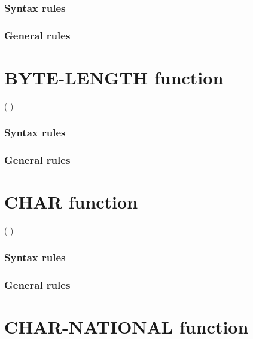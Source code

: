 \subsubsection{Syntax rules}

\subsubsection{General rules}

\section{BYTE-LENGTH function}

\begin{syntax}
    ( \argument )
\end{syntax}

\subsubsection{Syntax rules}

\subsubsection{General rules}

\section{CHAR function}

\begin{syntax}
    ( \argument )
\end{syntax}

\subsubsection{Syntax rules}

\subsubsection{General rules}

\section{CHAR-NATIONAL function}

\begin{syntax}
\end{syntax}


